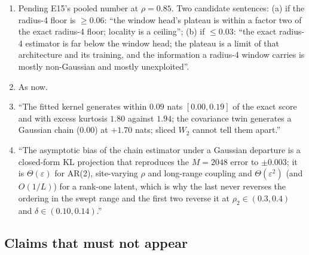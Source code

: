 \begin{enumerate}
\item {} Pending E15's pooled number at $\rho=0.85$. Two candidate sentences: (a) if the radius-4 floor is $\ge0.06$: ``the window head's plateau is within a factor two of the exact radius-4 floor; locality is a ceiling''; (b) if $\le0.03$: ``the exact radius-4 estimator is far below the window head; the plateau is a limit of that architecture and its training, and the information a radius-4 window carries is mostly non-Gaussian and mostly unexploited''.
\item {} As now.
\item {} ``The fitted kernel generates within $0.09$ nats $[0.00,0.19]$ of the exact score and with excess kurtosis $1.80$ against $1.94$; the covariance twin generates a Gaussian chain ($0.00$) at $+1.70$ nats; sliced $W_2$ cannot tell them apart.''
\item {} ``The asymptotic bias of the chain estimator under a Gaussian departure is a closed-form KL projection that reproduces the $M=2048$ error to $\pm0.003$; it is $\Theta(\varepsilon)$ for AR(2), site-varying $\rho$ and long-range coupling and $\Theta(\varepsilon^2)$ (and $O(1/L)$) for a rank-one latent, which is why the last never reverses the ordering in the swept range and the first two reverse it at $\rho_2\in(0.3,0.4)$ and $\delta\in(0.10,0.14)$.''
\end{enumerate}

\subsection{Claims that must not appear}

